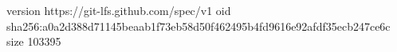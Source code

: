 version https://git-lfs.github.com/spec/v1
oid sha256:a0a2d388d71145beaab1f73eb58d50f462495b4fd9616e92afdf35ecb247ce6c
size 103395
